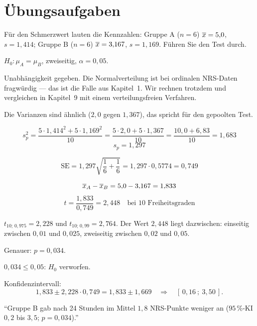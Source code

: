 \section{Übungsaufgaben}

\begin{aufgabe}
Für den Schmerzwert  lauten die Kennzahlen: Gruppe A ($n=6$) $\overline{x} = 5{,}0$, $s = 1{,}414$; Gruppe B ($n=6$) $\overline{x} = 3{,}167$, $s = 1{,}169$. Führen Sie den Test durch.

\loesung
{}
$H_0: \mu_A = \mu_B$, zweiseitig, $\alpha = 0{,}05$.

Unabhängigkeit gegeben. Die Normalverteilung ist bei ordinalen NRS-Daten fragwürdig --- das ist die Falle aus Kapitel~1. Wir rechnen trotzdem und vergleichen in Kapitel~9 mit einem verteilungsfreien Verfahren.

Die Varianzen sind ähnlich ($2{,}0$ gegen $1{,}367$), das spricht für den gepoolten Test.

\[ s_p^2 = \frac{5 \cdot 1{,}414^2 + 5 \cdot 1{,}169^2}{10} = \frac{5 \cdot 2{,}0 + 5 \cdot 1{,}367}{10} = \frac{10{,}0 + 6{,}83}{10} = 1{,}683 \]
\[ s_p = 1{,}297 \]

\[ \mathrm{SE} = 1{,}297\sqrt{\frac{1}{6}+\frac{1}{6}} = 1{,}297 \cdot 0{,}5774 = 0{,}749 \]

\[ \overline{x}_A - \overline{x}_B = 5{,}0 - 3{,}167 = 1{,}833 \]
\[ t = \frac{1{,}833}{0{,}749} = 2{,}448 \quad \text{bei } 10 \text{ Freiheitsgraden} \]

$t_{10;\,0{,}975} = 2{,}228$ und $t_{10;\,0{,}99} = 2{,}764$. Der Wert $2{,}448$ liegt dazwischen: einseitig zwischen $0{,}01$ und $0{,}025$, zweiseitig zwischen $0{,}02$ und $0{,}05$.

Genauer: $p = 0{,}034$.

$0{,}034 \le 0{,}05$: $H_0$ verworfen.

Konfidenzintervall:
\[ 1{,}833 \pm 2{,}228 \cdot 0{,}749 = 1{,}833 \pm 1{,}669 \quad\Longrightarrow\quad [\,0{,}16\ ;\ 3{,}50\,] . \]

\begin{center}
\begin{minipage}{0.88\textwidth}
\enquote{Gruppe B gab nach 24 Stunden im Mittel $1{,}8$ NRS-Punkte weniger an ($95\,\%$-KI $0{,}2$ bis $3{,}5$; $p = 0{,}034$).}
\end{minipage}
\end{center}


\end{aufgabe}
